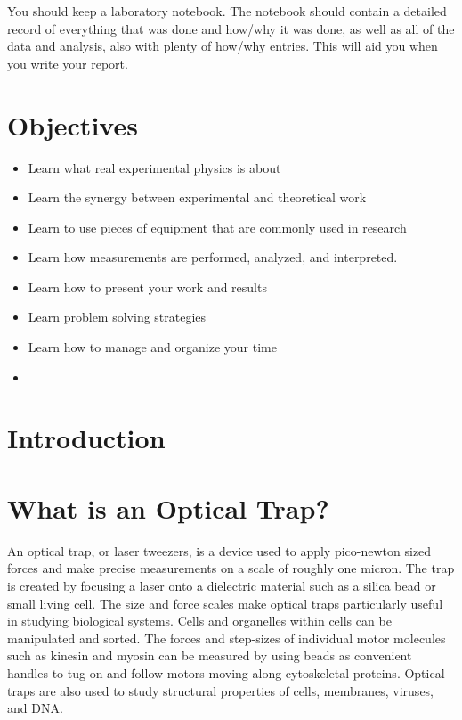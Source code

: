 \documentclass{../lab}
\begin{document}
You should keep a laboratory notebook. The notebook should contain a detailed record of everything that was done and how/why it was done, as well as all of the data and analysis, also with plenty of how/why entries. This will aid you when you write your report.

\section{Objectives}

\begin{itemize}
    \item Learn what real experimental physics is about

    \item Learn the synergy between experimental and theoretical work

    \item Learn to use pieces of equipment that are commonly used in research

    \item Learn how measurements are performed, analyzed, and interpreted.

    \item Learn how to present your work and results

    \item Learn problem solving strategies

    \item Learn how to manage and organize your time

    \item

\end{itemize}

\section{Introduction}

\section{What is an Optical Trap?}

An optical trap, or laser tweezers, is a device used to apply pico-newton sized forces and make precise measurements on a scale of roughly one micron. The trap is created by focusing a laser onto a dielectric material such as a silica bead or small living cell. The size and force scales make optical traps particularly useful in studying biological systems. Cells and organelles within cells can be manipulated and sorted. The forces and step-sizes of individual motor molecules such as kinesin and myosin can be measured by using beads as convenient handles to tug on and follow motors moving along cytoskeletal proteins. Optical traps are also used to study structural properties of cells, membranes, viruses, and DNA.
\end{document}
